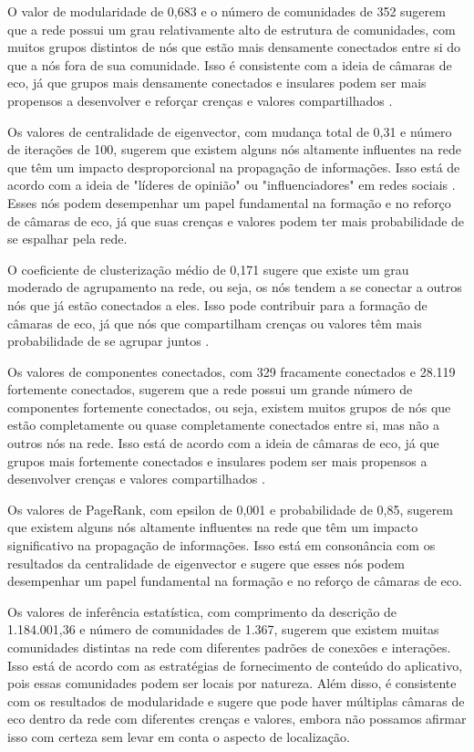 O valor de modularidade de 0,683 e o número de comunidades de 352 sugerem que a rede possui um grau relativamente alto de estrutura de comunidades, com muitos grupos distintos de nós que estão mais densamente conectados entre si do que a nós fora de sua comunidade. Isso é consistente com a ideia de câmaras de eco, já que grupos mais densamente conectados e insulares podem ser mais propensos a desenvolver e reforçar crenças e valores compartilhados \cite[]{2016_Vicario}.

Os valores de centralidade de eigenvector, com mudança total de 0,31 e número de iterações de 100, sugerem que existem alguns nós altamente influentes na rede que têm um impacto desproporcional na propagação de informações. Isso está de acordo com a ideia de "líderes de opinião" ou "influenciadores" em redes sociais
\cite[]{1955_Katz_BOOK}. Esses nós podem desempenhar um papel fundamental na formação e no reforço de câmaras de eco, já que suas crenças e valores podem ter mais probabilidade de se espalhar pela rede.

O coeficiente de clusterização médio de 0,171 sugere que existe um grau moderado de agrupamento na rede, ou seja, os nós tendem a se conectar a outros nós que já estão conectados a eles. Isso pode contribuir para a formação de câmaras de eco, já que nós que compartilham crenças ou valores têm mais probabilidade de se agrupar juntos \cite[]{1998_Watts}.

Os valores de componentes conectados, com 329 fracamente conectados e 28.119 fortemente conectados, sugerem que a rede possui um grande número de componentes fortemente conectados, ou seja, existem muitos grupos de nós que estão completamente ou quase completamente conectados entre si, mas não a outros nós na rede. Isso está de acordo com a ideia de câmaras de eco, já que grupos mais fortemente conectados e insulares podem ser mais propensos a desenvolver crenças e valores compartilhados \cite[]{2016_Vicario}.

Os valores de PageRank, com epsilon de 0,001 e probabilidade de 0,85, sugerem que existem alguns nós altamente influentes na rede que têm um impacto significativo na propagação de informações. Isso está em consonância com os resultados da centralidade de eigenvector e sugere que esses nós podem desempenhar um papel fundamental na formação e no reforço de câmaras de eco.

Os valores de inferência estatística, com comprimento da descrição de 1.184.001,36 e número de comunidades de 1.367, sugerem que existem muitas comunidades distintas na rede com diferentes padrões de conexões e interações. Isso está de acordo com as estratégias de fornecimento de conteúdo do aplicativo, pois essas comunidades podem ser locais por natureza. Além disso, é consistente com os resultados de modularidade e sugere que pode haver múltiplas câmaras de eco dentro da rede com diferentes crenças e valores, embora não possamos afirmar isso com certeza sem levar em conta o aspecto de localização.

